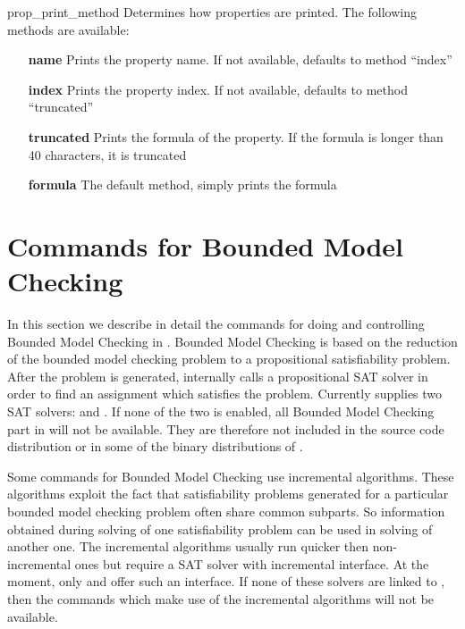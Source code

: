 \begin{nusmvVar} {prop\_print\_method}{}{}
Determines how properties are printed. The following methods are
available:
\begin{itemize}
  \item[\textbf{name}] Prints the property name. If not available, defaults to
        method ``index''

  \item[\textbf{index}] Prints the property index. If not available, defaults
       to method ``truncated''

  \item[\textbf{truncated}] Prints the formula of the property. If the formula
  is longer than 40 characters, it is truncated

  \item[\textbf{formula}] The default method, simply prints the formula
\end{itemize}
\end{nusmvVar}


\section{Commands for Bounded Model Checking}
\label{Commands for Bounded Model Checking}

In this section we describe in detail the commands for doing and
controlling Bounded Model Checking in \nusmv.  Bounded Model Checking
is based on the reduction of the bounded model checking problem to a
propositional satisfiability problem. After the problem is generated,
\nusmv internally calls a propositional SAT solver in order to find an
assignment which satisfies the problem.  Currently \nusmv supplies two
SAT solvers: \zchaff and \minisat. If none of the two is enabled, all
Bounded Model Checking part in \nusmv will not be
available. \zchaffminisatnotice They are therefore not included in the
source code distribution or in some of the binary distributions
of \nusmv.

Some commands for Bounded Model Checking use incremental algorithms.
These algorithms exploit the fact that satisfiability
problems generated for a particular bounded model checking problem
often share common subparts. So information obtained during solving of
one satisfiability problem can be used in solving of
another one. The incremental algorithms usually run quicker then
non-incremental ones but require a SAT solver with incremental
interface. At the moment, only \zchaff and \minisat offer such an
interface.  If none of these solvers are linked to \nusmv, then the
commands which make use of the incremental algorithms will not be available.

